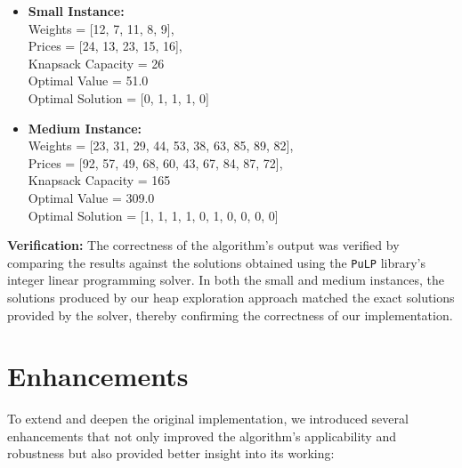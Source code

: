 \documentclass[conference]{IEEEtran}
\begin{document}
\begin{itemize}
    \item \textbf{Small Instance:}  \\
    Weights = [12, 7, 11, 8, 9],  \\
    Prices = [24, 13, 23, 15, 16],  \\
    Knapsack Capacity = 26 \\
    Optimal Value = 51.0 \\
    Optimal Solution = [0, 1, 1, 1, 0] \\
    \item \textbf{Medium Instance:}  \\
    Weights = [23, 31, 29, 44, 53, 38, 63, 85, 89, 82], \\  
    Prices = [92, 57, 49, 68, 60, 43, 67, 84, 87, 72], \\
    Knapsack Capacity = 165 \\
    Optimal Value = 309.0 \\
    Optimal Solution = [1, 1, 1, 1, 0, 1, 0, 0, 0, 0] \\
\end{itemize}

\vspace{0.5em}
\noindent
\textbf{Verification:}
The correctness of the algorithm’s output was verified by comparing the results against the solutions obtained using the \texttt{PuLP} library's integer linear programming solver. In both the small and medium instances, the solutions produced by our heap exploration approach matched the exact solutions provided by the solver, thereby confirming the correctness of our implementation.


\section{Enhancements}

To extend and deepen the original implementation, we introduced several enhancements that not only improved the algorithm's applicability and robustness but also provided better insight into its working:
\end{document}
